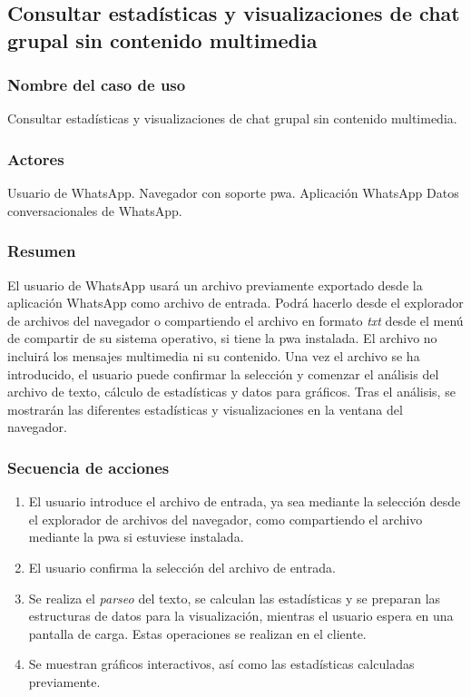 \subsection{Consultar estadísticas y visualizaciones de chat grupal sin contenido multimedia}

\subsubsection{Nombre del caso de uso} Consultar estadísticas y visualizaciones de chat grupal sin contenido multimedia.

\subsubsection{Actores}

Usuario de WhatsApp.
Navegador con soporte \acrfull{pwa}.
Aplicación WhatsApp
Datos conversacionales de WhatsApp.

\subsubsection{Resumen} El usuario de WhatsApp usará un archivo previamente exportado desde la aplicación WhatsApp como archivo de entrada. Podrá hacerlo desde el explorador de archivos del navegador o compartiendo el archivo en formato \textit{txt} desde el menú de compartir de su sistema operativo, si tiene la \acrfull{pwa} instalada. El archivo no incluirá los mensajes multimedia ni su contenido. Una vez el archivo se ha introducido, el usuario puede confirmar la selección y comenzar el análisis del archivo de texto, cálculo de estadísticas y datos para gráficos. Tras el análisis, se mostrarán las diferentes estadísticas y visualizaciones en la ventana del navegador.

\subsubsection{Secuencia de acciones}

\begin{enumerate}
	\item El usuario introduce el archivo de entrada, ya sea mediante la selección desde el explorador de archivos del navegador, como compartiendo el archivo mediante la \acrshort{pwa} si estuviese instalada.
	\item El usuario confirma la selección del archivo de entrada.
	\item Se realiza el \textit{parseo} del texto, se calculan las estadísticas y se preparan las estructuras de datos para la visualización, mientras el usuario espera en una pantalla de carga. Estas operaciones se realizan en el cliente.
	\item Se muestran gráficos interactivos, así como las estadísticas calculadas previamente.
\end{enumerate}

